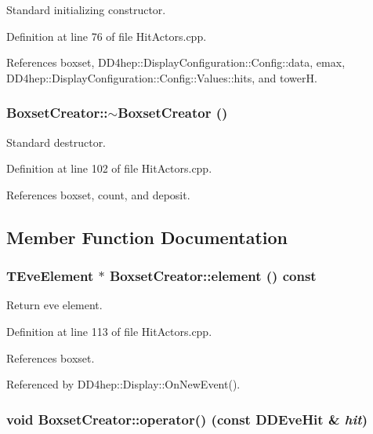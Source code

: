 Standard initializing constructor. 

Definition at line 76 of file HitActors.cpp.

References boxset, DD4hep::DisplayConfiguration::Config::data, emax, DD4hep::DisplayConfiguration::Config::Values::hits, and towerH.\hypertarget{struct_d_d4hep_1_1_boxset_creator_a244124a28255dd2e0533a64ce7ee1b56}{
\subsubsection[{$\sim$BoxsetCreator}]{\setlength{\rightskip}{0pt plus 5cm}BoxsetCreator::$\sim$BoxsetCreator ()}}
\label{struct_d_d4hep_1_1_boxset_creator_a244124a28255dd2e0533a64ce7ee1b56}


Standard destructor. 

Definition at line 102 of file HitActors.cpp.

References boxset, count, and deposit.

\subsection{Member Function Documentation}
\hypertarget{struct_d_d4hep_1_1_boxset_creator_afce37024e266b221fcc84fc92dbff3e7}{
\subsubsection[{element}]{\setlength{\rightskip}{0pt plus 5cm}TEveElement $\ast$ BoxsetCreator::element () const}}
\label{struct_d_d4hep_1_1_boxset_creator_afce37024e266b221fcc84fc92dbff3e7}


Return eve element. 

Definition at line 113 of file HitActors.cpp.

References boxset.

Referenced by DD4hep::Display::OnNewEvent().\hypertarget{struct_d_d4hep_1_1_boxset_creator_a25f63197d03ad33193ac3c77207db808}{
\subsubsection[{operator()}]{\setlength{\rightskip}{0pt plus 5cm}void BoxsetCreator::operator() (const {\bf DDEveHit} \& {\em hit})}}
\label{struct_d_d4hep_1_1_boxset_creator_a25f63197d03ad33193ac3c77207db808}


